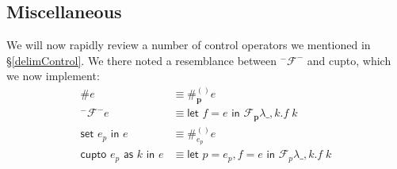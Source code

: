 \documentclass[11pt]{article}
\newcommand{\maybePage}{\newpage}
\newcommand{\abort}[2]{\textsf{abort}[#1]\;#2}
\newcommand{\letin}[2]{\textsf{let }#1\textsf{ in }#2}
\newcommand\F{\mathcal{F}}
\begin{document}
%
%
%
%

\maybePage
\subsection{Miscellaneous}
\label{subsec:implMisc}

We will now rapidly review a number of control operators we mentioned in \S\ref{delimControl}.
We there noted a resemblance between $^-\F^-$ and cupto, which we now implement:
\begin{align*}
\#e &\equiv \#_\mathbf{p}^{()}e \\
^-\F^-e &\equiv
	\letin{f=e}{\F_\mathbf{p}\lambda \_,k.f\;k} \\
%
\textsf{set }e_p\textsf{ in }e &\equiv
	\#_{e_p}^{()}e \\
\textsf{cupto }e_p\textsf{ as }k\textsf{ in }e &\equiv
	\letin{p = e_p,f=e}{\F_p\lambda \_,k.f\;k} \\
\end{align*}
\end{document}
